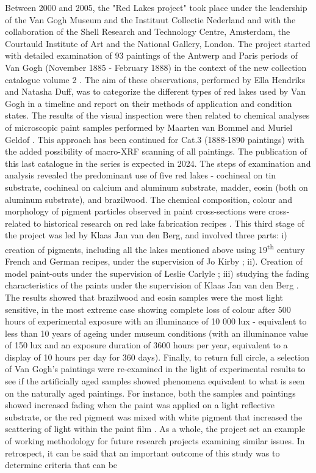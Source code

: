 \begin{appendices}
Between 2000 and 2005, the "Red Lakes project" took place under the leadership of the Van Gogh Museum and the Instituut Collectie Nederland and with the collaboration of the Shell Research and Technology Centre, Amsterdam, the Courtauld Institute of Art and the National Gallery, London. The project started with detailed examination of 93 paintings of the Antwerp and Paris periods of Van Gogh (November 1885 - February 1888) in the context of the new collection catalogue volume 2 \citep{hendriks_vincent_2011}. The aim of these observations, performed by Ella Hendriks and Natasha Duff, was to categorize the different types of red lakes used by Van Gogh in a timeline and report on their methods of application and condition states. The results of the visual inspection were then related to chemical analyses of microscopic paint samples performed by Maarten van Bommel and Muriel Geldof \citep{bommel_investigation_2005}. This approach has been continued for Cat.3 (1888-1890 paintings) with the added possibility of macro-XRF scanning of all paintings. The publication of this last catalogue in the series is expected in 2024. The steps of examination and analysis revealed the predominant use of five red lakes - cochineal on tin substrate, cochineal on calcium and aluminum substrate, madder, eosin (both on aluminum substrate), and brazilwood. The chemical composition, colour and morphology of pigment particles observed in paint cross-sections were cross-related to historical research on red lake fabrication recipes \citep{kirby_reconstruction_2005}. This third stage of the project was led by Klaas Jan van den Berg, and involved three parts: i) creation of pigments, including all the lakes mentioned above using 19\textsuperscript{th} century French and German recipes, under the supervision of Jo Kirby \citeyear{kirby_reconstruction_2005} ; ii). Creation of model paint-outs under the supervision of Leslie Carlyle \citep{carlyle_reconstructions_2020}; iii) studying the fading characteristics of the paints under the supervision of Klaas Jan van den Berg \citep{burnstock_comparison_2005,van_den_berg_fading_2006}. The results showed that brazilwood and eosin samples were the most light sensitive, in the most extreme case showing complete loss of colour after 500 hours of experimental exposure with an illuminance of 10 000 lux - equivalent to less than 10 years of ageing under museum conditions (with an illuminance value of 150 lux and an exposure duration of 3600 hours per year, equivalent to a display of 10 hours per day for 360 days). Finally, to return full circle, a selection of Van Gogh’s paintings were re-examined in the light of experimental results to see if the artificially aged samples showed phenomena equivalent to what is seen on the naturally aged paintings. For instance, both the samples and paintings showed increased fading when the paint was applied on a light reflective substrate, or the red pigment was mixed with white pigment that increased the scattering of light within the paint film \citep[p.463-465]{burnstock_comparison_2005}. As a whole, the project set an example of working methodology for future research projects examining similar issues. In retrospect, it can be said that an important outcome of this study was to determine criteria that can be 
\end{appendices}
